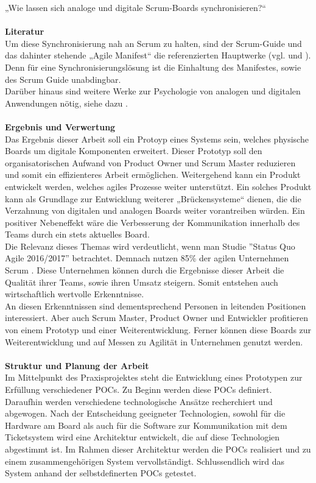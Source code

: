 \documentclass[12pt,titlepage]{scrartcl}
\begin{document}
„Wie lassen sich analoge und digitale Scrum-Boards synchronisieren?“ \\ \\
\textbf{Literatur} \\
Um diese Synchronisierung nah an Scrum zu halten, sind der Scrum-Guide und das dahinter stehende „Agile Manifest“ die referenzierten Hauptwerke (vgl. \cite{manifest} und \cite{guide}). Denn für eine Synchronisierungslösung ist die Einhaltung des Manifestes, sowie des Scrum Guide unabdingbar. \\
Darüber hinaus sind weitere Werke zur Psychologie von analogen und digitalen Anwendungen nötig, siehe dazu \cite{pen}. \\ \\
\textbf{Ergebnis und Verwertung} \\
Das Ergebnis dieser Arbeit soll ein Protoyp eines Systems sein, welches physische Boards um digitale Komponenten erweitert. Dieser Prototyp soll den organisatorischen Aufwand von Product Owner und Scrum Master reduzieren und somit ein effizienteres Arbeit ermöglichen. Weitergehend kann ein Produkt entwickelt werden, welches agiles Prozesse weiter unterstützt. 
Ein solches Produkt kann als Grundlage zur Entwicklung weiterer „Brückensysteme“ dienen, die die Verzahnung von digitalen und analogen Boards weiter vorantreiben würden. Ein positiver Nebeneffekt wäre die Verbesserung der Kommunikation innerhalb des Teams durch ein stets aktuelles Board. \\
Die Relevanz dieses Themas wird verdeutlicht, wenn man Studie ''Status Quo Agile 2016/2017'' betrachtet. Demnach nutzen 85\% der agilen Unternehmen Scrum \cite{hskob}. Diese Unternehmen können durch die Ergebnisse dieser Arbeit die Qualität ihrer Teams, sowie ihren Umsatz steigern. Somit entstehen auch wirtschaftlich wertvolle Erkenntnisse. \\
An diesen Erkenntnissen sind dementsprechend Personen in leitenden Positionen interessiert. Aber auch Scrum Master, Product Owner und Entwickler profitieren von einem Prototyp und einer Weiterentwicklung. Ferner können diese Boards zur Weiterentwicklung und auf Messen zu Agilität in Unternehmen genutzt werden. \\ \\
\textbf{Struktur und Planung der Arbeit} \\
Im Mittelpunkt des Praxisprojektes steht die Entwicklung eines Prototypen zur Erfüllung verschiedener POCs. Zu Beginn werden diese POCs definiert. Daraufhin werden verschiedene technologische Ansätze recherchiert und abgewogen. Nach der Entscheidung geeigneter Technologien, sowohl für die Hardware am Board als auch für die Software zur Kommunikation mit dem Ticketsystem wird eine Architektur entwickelt, die auf diese Technologien abgestimmt ist. Im Rahmen dieser Architektur werden die POCs realisiert und zu einem zusammengehörigen System vervollständigt. Schlussendlich wird das System anhand der selbstdefinerten POCs getestet.\\
\end{document}
